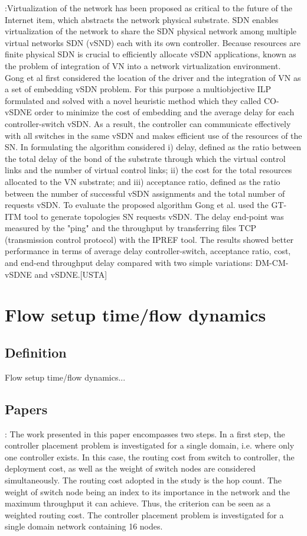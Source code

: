 \documentclass[a4paper,10pt]{article}
\begin{document}
\cite{GoGi17}:Virtualization of the network has been proposed as critical to the future of the Internet item, which abstracts the network physical substrate. SDN enables virtualization of the network to share the SDN physical network among multiple virtual networks SDN (vSND) each with its own controller. Because resources are finite physical SDN is crucial to efficiently allocate vSDN applications, known as the problem of integration of VN into a network virtualization environment. Gong et al first considered the location of the driver and the integration of VN as a set of embedding vSDN problem. For this purpose a multiobjective ILP formulated and solved with a novel heuristic method which they called CO-vSDNE order to minimize the cost of embedding and the average delay for each controller-switch vSDN. As a result, the controller can communicate effectively with all switches in the same vSDN and makes efficient use of the resources of the SN. In formulating the algorithm considered i) delay, defined as the ratio between the total delay of the bond of the substrate through which the virtual control links and the number of virtual control links; ii) the cost for the total resources allocated to the VN substrate; and iii) acceptance ratio, defined as the ratio between the number of successful vSDN assignments and the total number of requests vSDN.
To evaluate the proposed algorithm Gong et al. used the GT-ITM tool to generate topologies SN requests vSDN. The delay end-point was measured by the "ping" and the throughput by transferring files TCP (transmission control protocol) with the IPREF tool. The results showed better performance in terms of average delay controller-switch, acceptance ratio, cost, and end-end throughput delay compared with two simple variations: DM-CM-vSDNE and vSDNE.[USTA]

\section{Flow setup time/flow dynamics}
\subsection{Definition}
Flow setup time/flow dynamics...

\subsection{Papers}
\cite{YaHo15}: The work presented in this paper encompasses two steps. In a first step, the controller placement problem is investigated for a single domain, i.e. where only one controller exists. In this case, the routing cost from switch to controller, the deployment cost, as well as the weight of switch nodes are considered simultaneously. The routing cost adopted in the study is the hop count. The weight of switch node being an index to its importance in the network and the maximum throughput it can achieve. Thus, the criterion can be seen as a weighted routing cost. The controller placement problem is investigated for a single domain network containing 16 nodes.
\end{document}
